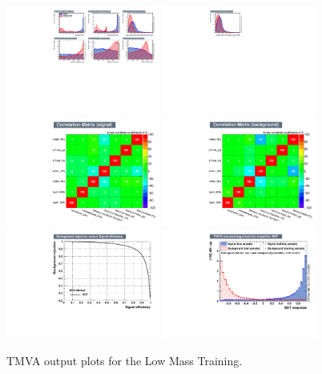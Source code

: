 \begin{figure}[thb]
  \centering
  \includegraphics[width=0.45\textwidth]{figures/sec-cats/mva/vars1_lm400}\hfil
  \includegraphics[width=0.45\textwidth]{figures/sec-cats/mva/vars2_lm400}\hfil
  \includegraphics[width=0.45\textwidth]{figures/sec-cats/mva/corsS_lm400}\hfil
  \includegraphics[width=0.45\textwidth]{figures/sec-cats/mva/corsB_lm400}\hfil
  \includegraphics[width=0.45\textwidth]{figures/sec-cats/mva/ROC_lm400}\hfil
  \includegraphics[width=0.45\textwidth]{figures/sec-cats/mva/discr_lm400}\hfil
  \caption{TMVA output plots for the Low Mass Training.}
  \label{fig:mva_lm}
\end{figure}

